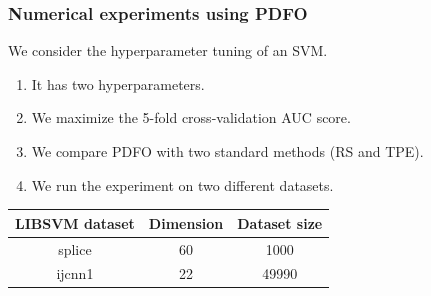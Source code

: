\documentclass{polyu-presentation}
\begin{document}
\begin{frame}
    \frametitle{Numerical experiments using PDFO}

    We consider the \alert{hyperparameter tuning} of an SVM.
    \begin{enumerate}
        \item It has two hyperparameters.
        \item We maximize the \num{5}-fold cross-validation \alert{AUC score}.
        \item We compare PDFO with two standard methods (\alert{RS} and \alert{TPE}).
        \item We run the experiment on two different datasets.
    \end{enumerate}

    \bigskip

    \begin{center}
        \begin{tabular}{@{}cS[table-format=2]S[table-format=5]@{}}
            \toprule
            LIBSVM dataset  & {Dimension}   & {Dataset size}\\
            \midrule
            splice          & 60            & 1000\\
            ijcnn1          & 22            & 49990\\
            \bottomrule
        \end{tabular}
    \end{center}
\end{frame}
\end{document}
